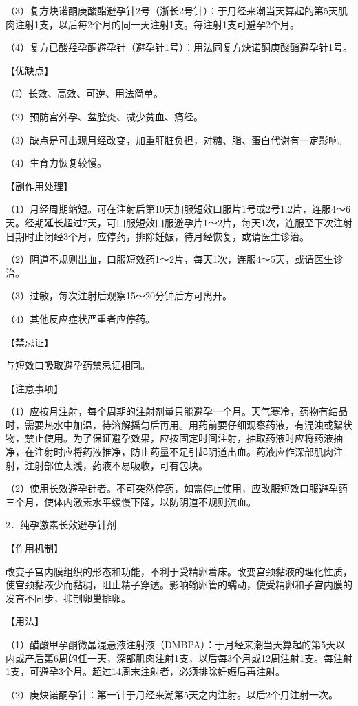 \documentclass[12pt,UTF8]{ctexbook}
\begin{document}
（3）复方炔诺酮庚酸酯避孕针2号（浙长2号针）：于月经来潮当天算起的第5天肌肉注射1支，以后每2个月的同一天注射1支。每注射1支可避孕2个月。

（4）复方已酸羟孕酮避孕针（避孕针1号）：用法同复方炔诺酮庚酸酯避孕针1号。

【优缺点】

（I）长效、高效、可逆、用法简单。

（2）预防宫外孕、盆腔炎、减少贫血、痛经。

（3）缺点是可出现月经改变，加重肝脏负担，对糖、脂、蛋白代谢有一定影响。

（4）生育力恢复较慢。

【副作用处理】

（1）月经周期缩短。可在注射后第10天加服短效口服片1号或2号1.2片，连服4～6天。经期延长超过7天，可口服短效口服避孕片1～2片，每天1次，连服至下次注射日期时止闭经3个月，应停药，排除妊娠，待月经恢复，或请医生诊治。

（2）阴道不规则出血，口服短效药1～2片，每天1次，连服4～5天，或请医生诊治。

（3）过敏，每次注射后观察15～20分钟后方可离开。

（4）其他反应症状严重者应停药。

【禁忌证】

与短效口吸取避孕药禁忌证相同。

【注意事项】

（1）应按月注射，每个周期的注射剂量只能避孕一个月。天气寒冷，药物有结晶时，需要热水中加温，待溶解摇匀后再用。用药前要仔细观察药液，有混浊或絮状物，禁止使用。为了保证避孕效果，应按固定时间注射，抽取药液时应将药液抽净，在注射时应将药液推净，防止药量不足引起阴道出血。药液应作深部肌肉注射，注射部位太浅，药液不易吸收，可有包块。

（2）使用长效避孕针者。不可突然停药，如需停止使用，应改服短效口服避孕药三个月，使体内激素水平缓慢下降，以防阴道不规则流血。

2．纯孕激素长效避孕针剂

【作用机制】

改变子宫内膜组织的形态和功能，不利于受精卵着床。改变宫颈黏液的理化性质，使宫颈黏液少而黏稠，阻止精子穿透。影响输卵管的蠕动，使受精卵和子宫内膜的发育不同步，抑制卵巢排卵。

【用法】

（1）醋酸甲孕酮微晶混悬液注射液（DMBPA）：于月经来潮当天算起的第5天以内或产后第6周的任一天，深部肌肉注射1支，以后每3个月或12周注射1支。每注射1支，可避孕3个月。超过14周末注射者，必须排除妊娠后再注射。

（2）庚炔诺酮孕针：第一针于月经来潮第5天之内注射。以后2个月注射一次。
\end{document}
